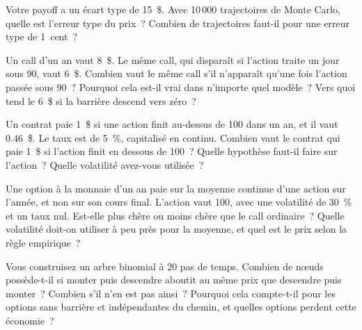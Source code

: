 \begin{question}\label{iq:iv2:pricing-and-numerics:4}
Votre payoff a un écart type de 15~\$. Avec 10\,000 trajectoires de Monte Carlo, quelle est l'erreur type du prix~? Combien de trajectoires faut-il pour une erreur type de 1~cent~?
\end{question}

\begin{question}\label{iq:iv2:pricing-and-numerics:5}
Un call d'un an vaut 8~\$. Le même call, qui disparaît si l'action traite un jour sous 90, vaut 6~\$. Combien vaut le même call s'il n'apparaît qu'une fois l'action passée sous 90~? Pourquoi cela est-il vrai dans n'importe quel modèle~? Vers quoi tend le 6~\$ si la barrière descend vers zéro~?
\end{question}

\begin{question}\label{iq:iv2:pricing-and-numerics:6}
Un contrat paie 1~\$ si une action finit au-dessus de 100 dans un an, et il vaut 0.46~\$. Le taux est de 5~\%, capitalisé en continu. Combien vaut le contrat qui paie 1~\$ si l'action finit en dessous de 100~? Quelle hypothèse faut-il faire sur l'action~? Quelle volatilité avez-vous utilisée~?
\end{question}

\begin{question}\label{iq:iv2:pricing-and-numerics:7}
Une option à la monnaie d'un an paie sur la moyenne continue d'une action sur l'année, et non sur son cours final. L'action vaut 100, avec une volatilité de 30~\% et un taux nul. Est-elle plus chère ou moins chère que le call ordinaire~? Quelle volatilité doit-on utiliser à peu près pour la moyenne, et quel est le prix selon la règle empirique~?
\end{question}

\begin{question}\label{iq:iv2:pricing-and-numerics:8}
Vous construisez un arbre binomial à 20 pas de temps. Combien de nœuds possède-t-il si monter puis descendre aboutit au même prix que descendre puis monter~? Combien s'il n'en est pas ainsi~? Pourquoi cela compte-t-il pour les options sans barrière et indépendantes du chemin, et quelles options perdent cette économie~?
\end{question}

